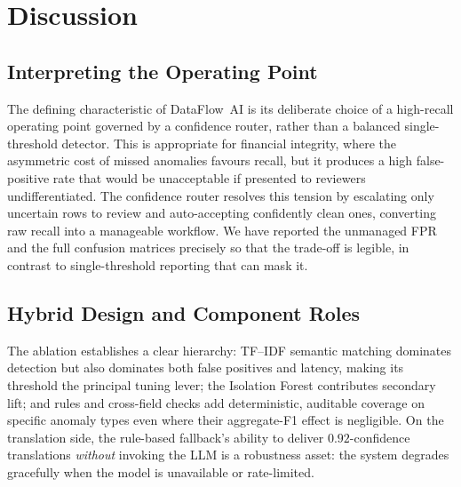 \documentclass{ieeeaccess}
\begin{document}
\section{Discussion}
\label{sec:discussion}

\subsection{Interpreting the Operating Point}
The defining characteristic of DataFlow~AI is its deliberate choice of a high-recall operating point governed by a
confidence router, rather than a balanced single-threshold detector. This is appropriate for financial integrity, where
the asymmetric cost of missed anomalies favours recall, but it produces a high false-positive rate that would be
unacceptable if presented to reviewers undifferentiated. The confidence router resolves this tension by escalating only
uncertain rows to review and auto-accepting confidently clean ones, converting raw recall into a manageable workflow. We
have reported the unmanaged FPR and the full confusion matrices precisely so that the trade-off is legible, in contrast to
single-threshold reporting that can mask it.

\subsection{Hybrid Design and Component Roles}
The ablation establishes a clear hierarchy: TF--IDF semantic matching dominates detection but also dominates both false
positives and latency, making its threshold the principal tuning lever; the Isolation Forest contributes secondary lift;
and rules and cross-field checks add deterministic, auditable coverage on specific anomaly types even where their
aggregate-F1 effect is negligible. On the translation side, the rule-based fallback's ability to deliver $0.92$-confidence
translations \emph{without} invoking the LLM is a robustness asset: the system degrades gracefully when the model is
unavailable or rate-limited.
\end{document}
